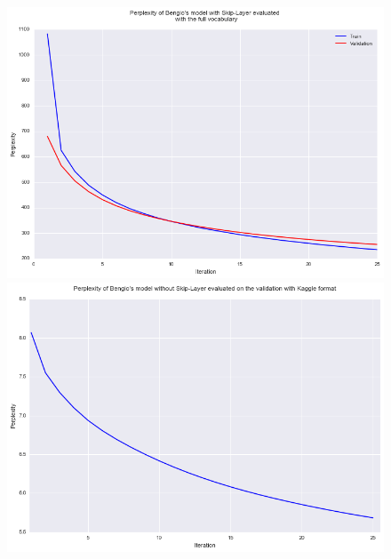 \documentclass[11pt]{article}
\begin{document}
\begin{figure}[H]
  \centering
  \begin{minipage}[b]{0.45\textwidth}
    \includegraphics[width=\textwidth]{noskip_tr}
  \end{minipage}
  \hfill
  \begin{minipage}[b]{0.45\textwidth}
    \includegraphics[width=\textwidth]{noskip_val}
  \end{minipage}
\end{figure}
\end{document}
